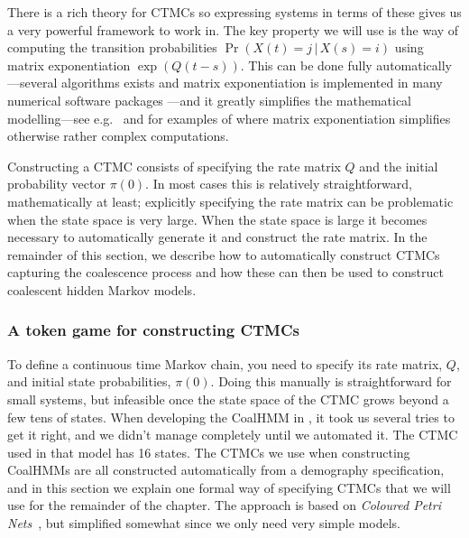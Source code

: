 \documentclass[graybox]{svmult}
\begin{document}

There is a rich theory for CTMCs so expressing systems in terms of these gives us a very powerful framework to work in. The key property we will use is the way of computing the transition probabilities $\Pr(X(t)=j\,|\,X(s)=i)$ using matrix exponentiation $\exp\left(Q\left(t-s\right)\right)$. This can be done fully automatically---several algorithms exists and matrix exponentiation is implemented in many numerical software packages \cite{Moler2003}---and it greatly simplifies the mathematical modelling---see e.g.\ \citet{Hobolth:2011hl} and \citet{Andersen:2013iz} for examples of where matrix exponentiation simplifies otherwise rather complex computations.

Constructing a CTMC consists of specifying the rate matrix $Q$ and the initial probability vector $\pi(0)$. In most cases this is relatively straightforward, mathematically at least; explicitly specifying the rate matrix can be problematic when the state space is very large. When the state space is large it becomes necessary to automatically generate it and construct the rate matrix. In the remainder of this section, we describe how to automatically construct CTMCs capturing the coalescence process and how these can then be used to construct coalescent hidden Markov models.

\subsubsection{A token game for constructing CTMCs}

To define a continuous time Markov chain, you need to specify its rate matrix, $Q$, and initial state probabilities, $\pi(0)$. Doing this manually is straightforward for small systems, but infeasible once the state space of the CTMC grows beyond a few tens of states. When developing the CoalHMM in \citet{Mailund:2011dva}, it took us several tries to get it right, and we didn't manage completely until we automated it. The CTMC used in that model has 16 states. The CTMCs we use when constructing CoalHMMs are all constructed automatically from a demography specification, and in this section we explain one formal way of specifying CTMCs that we will use for the remainder of the chapter. The approach is based on \emph{Coloured Petri Nets}~\cite{Jensen:2013jg}, but simplified somewhat since we only need very simple models.
\end{document}
